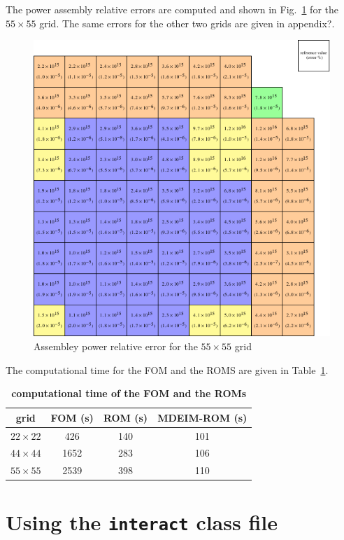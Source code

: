 \documentclass[]{interact}
\theoremstyle{plain}%
\theoremstyle{definition}
\theoremstyle{remark}
\begin{document}
The power assembly relative errors are computed and shown in Fig.~\ref{fig:assembly power error fm=5} for the $55\times 55$ grid.
The same errors for the other two grids are given in appendix?.
\begin{figure}[H]
	\includegraphics[width=0.9\linewidth]{../figures/lra_assemb_fm=5.pdf}
	\caption{Assembley power relative error for the $55\times 55$ grid}
	\label{fig:assembly power error fm=5}
\end{figure} 

The computational time for the FOM and the ROMS are given in Table~\ref{table:cpu time}.

\begin{table}[h!]
	\centering
	\caption{\bf computational time of the FOM and the ROMs}
	\label{table:cpu time}
	\begin{tabular}{c|c|c|c}  
		grid &	FOM (s)   &  ROM (s) & MDEIM-ROM (s)    \\
		\hline
		$22\times 22$ & 426   & 140   & 101   \\
		$44\times 44$ &  1652  &   283 &  106  \\
		$55\times 55$ &  2539  & 398   & 110   \\
		\hline
	\end{tabular}
\end{table}

\section{Using the \texttt{interact} class file}
\end{document}

